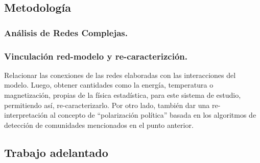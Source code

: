 \documentclass{proyectotesis}
\begin{document}
\subsection{Metodología}
\subsubsection{Análisis de Redes Complejas.}

%
%


\subsubsection{Vinculación red-modelo y re-caracterizción.} Relacionar las conexiones de las redes elaboradas con las interacciones del modelo. Luego, obtener cantidades como la energía, temperatura o magnetización, propias de la física estadística, para este sistema de estudio, permitiendo así, re-caracterizarlo. Por otro lado, también dar una re-interpretación al concepto de ``polarización política''  basada en los algoritmos de detección de comunidades mencionados en el punto anterior. 
\subsection{Trabajo adelantado}
\end{document}
